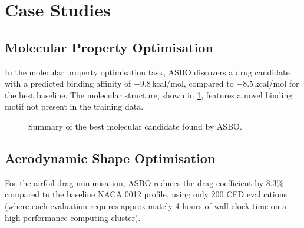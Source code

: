 \section{Case Studies}
\label{sec:case-studies}

\subsection{Molecular Property Optimisation}
\label{subsec:molecular}

In the molecular property optimisation task, ASBO discovers a drug candidate
with a predicted binding affinity of $-9.8$\,kcal/mol, compared to $-8.5$\,kcal/mol
for the best baseline.  The molecular structure, shown in \cref{fig:molecular},
features a novel binding motif not present in the training data.

\begin{figure}[htbp]
    \centering
    \caption{Summary of the best molecular candidate found by ASBO.}
    \label{fig:molecular}
\end{figure}

\subsection{Aerodynamic Shape Optimisation}
\label{subsec:aerodynamic}

For the airfoil drag minimisation, ASBO reduces the drag coefficient by 8.3\%
compared to the baseline NACA 0012 profile, using only 200 CFD evaluations
(where each evaluation requires approximately 4 hours of wall-clock time on a
high-performance computing cluster).

